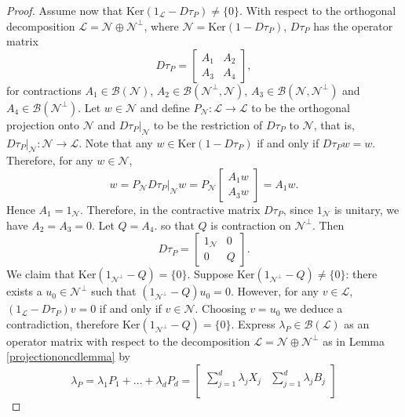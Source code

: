 \documentclass[11pt, reqno]{amsart}
\newcommand\1{\boldsymbol {1}}
\numberwithin{equation}{section}
\begin{document}
\begin{proof}
 Assume now that $\mathrm{Ker}(1_{\mathcal{L}}-D\tau_{P})\neq \{0\}$. With respect to the orthogonal decomposition $\mathcal{L}=\mathcal{N}\oplus \mathcal{N}^{\perp}$, where $\mathcal{N}=\mathrm{Ker}(1-D\tau_{P})$, $D\tau_{P}$ has the operator matrix
$$D\tau_{P} = \begin{bmatrix}
    A_{1} & A_{2} \\
    A_{3} & A_{4}
\end{bmatrix},$$
for contractions $A_{1}\in\mathcal{B(N)}$, $A_{2}\in\mathcal{B(N^{\perp},N)}$, $A_{3}\in\mathcal{B(N,N^{\perp})}$ and $A_{4}\in \mathcal{B(N^{\perp})}$. Let $w\in\mathcal{N}$ and define $P_{\mathcal{N}}:\mathcal{L}\rightarrow\mathcal{L}$ to be the orthogonal projection onto $\mathcal{N}$ and $D\tau_{P}|_{\mathcal{N}}$ to be the restriction of $D\tau_{P}$ to $\mathcal{N}$, that is, $D\tau_{P}|_{\mathcal{N}}: \mathcal{N}\rightarrow \mathcal{L}$. Note that any $w\in\mathrm{Ker}(1-D\tau_{P})$ if and only if $D\tau_{P} w = w$. Therefore, for any $w\in\mathcal{N}$,
$$w = P_{\mathcal{N}}D\tau_{P}|_{\mathcal{N}}w = P_{\mathcal{N}}\begin{bmatrix}
    A_{1}w \\
    A_{3}w
\end{bmatrix} = A_{1}w.$$
Hence $A_{1}=1_{\mathcal{N}}$. Therefore,  in the contractive matrix  $D\tau_{P}$, since $1_{\mathcal{N}}$ is unitary, we have $A_{2}=A_{3}=0$. Let $Q=A_{4}$. so that $Q$ is contraction on $\mathcal{N}^{\perp}$.  Then 
$$D\tau_{P} = \begin{bmatrix}
    1_{\mathcal{N}} & 0 \\
    0 & Q
\end{bmatrix}.$$
We claim that $\mathrm{Ker}(1_{\mathcal{N}^{\perp}}-Q)=\{0\}$. Suppose $\mathrm{Ker}(1_{\mathcal{N}^{\perp}}-Q)\neq\{0\}$: there exists a $u_{0}\in\mathcal{N^{\perp}}$ such that $(1_{\mathcal{N}^{\perp}}-Q)u_{0}=0$. However, for any 
 $v\in\mathcal{L}$, $(1_{\mathcal{L}}-D\tau_{P})v=0$ if and only if
 $v\in\mathcal{N}$.  Choosing $v=u_0$ we deduce a contradiction, therefore $\mathrm{Ker}(1_{\mathcal{N}^{\perp}}-Q)=\{0\}$.
 Express $\lambda_{P}\in\mathcal{B(L)}$ as an operator matrix with respect to the decomposition $\mathcal{L}=\mathcal{N}\oplus\mathcal{N}^{\perp}$ as in Lemma \ref{projectiononcdlemma} by
\begin{equation}\label{lambdasanoperator123}
\lambda_{P}=\lambda_{1}P_{1}+\hdots+\lambda_{d}P_{d}= \begin{bmatrix}
        \sum_{j=1}^{d} \lambda_{j}X_{j} & \sum_{j=1}^{d}\lambda_{j}B_{j}\\

\end{bmatrix}
\end{equation}
\end{proof}
\end{document}
